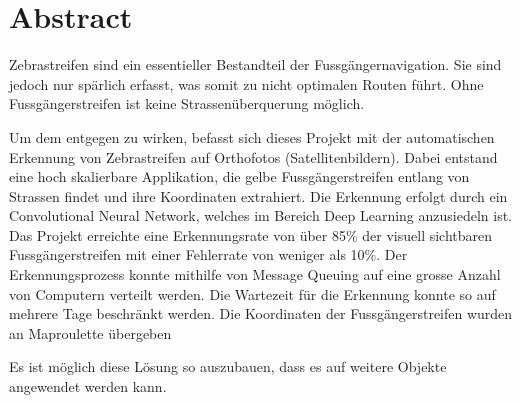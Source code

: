 \chapter*{Abstract}

Zebrastreifen sind ein essentieller Bestandteil der Fussgängernavigation. Sie sind jedoch  nur spärlich erfasst, was somit zu nicht optimalen Routen führt. Ohne Fussgängerstreifen ist keine Strassenüberquerung möglich.

Um dem entgegen zu wirken,  befasst sich dieses Projekt mit der automatischen Erkennung von Zebrastreifen auf Orthofotos (Satellitenbildern). 
Dabei entstand eine hoch skalierbare Applikation, die gelbe Fussgängerstreifen entlang von Strassen findet und ihre Koordinaten extrahiert. Die Erkennung erfolgt durch ein Convolutional Neural Network, welches im Bereich Deep Learning anzusiedeln ist.
Das Projekt erreichte eine Erkennungsrate von über 85\% der visuell sichtbaren Fussgängerstreifen mit einer Fehlerrate von weniger als 10\%. Der Erkennungsprozess konnte mithilfe von Message Queuing auf eine grosse Anzahl von Computern verteilt werden. Die Wartezeit für die Erkennung konnte so auf mehrere Tage beschränkt werden. Die Koordinaten der Fussgängerstreifen wurden an Maproulette übergeben

Es ist möglich diese Lösung so auszubauen, dass es auf weitere Objekte angewendet werden kann.
